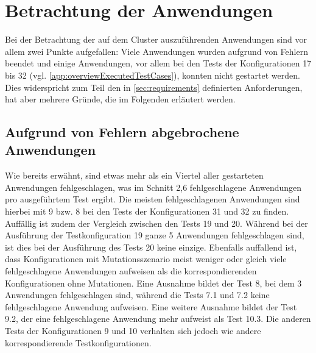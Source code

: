 \section{Betrachtung der Anwendungen}
\label{sec:appEval}

Bei der Betrachtung der auf dem Cluster auszuführenden Anwendungen sind vor allem zwei Punkte aufgefallen:
Viele Anwendungen wurden aufgrund von Fehlern beendet und einige Anwendungen, vor allem bei den Tests der Konfigurationen 17 bis 32 (vgl. \cref{app:overviewExecutedTestCases}), konnten nicht gestartet werden.
Dies widerspricht zum Teil den in \cref{sec:requirements} definierten Anforderungen, hat aber mehrere Gründe, die im Folgenden erläutert werden.

\subsection{Aufgrund von Fehlern abgebrochene Anwendungen}
\label{subsec:failedApps}

Wie bereits erwähnt, sind etwas mehr als ein Viertel aller gestarteten Anwendungen fehlgeschlagen, was im Schnitt 2,6 fehlgeschlagene Anwendungen pro ausgeführtem Test ergibt.
Die meisten fehlgeschlagenen Anwendungen sind hierbei mit 9 bzw. 8 bei den Tests der Konfigurationen 31 und 32 zu finden.
Auffällig ist zudem der Vergleich zwischen den Tests 19 und 20.
Während bei der Ausführung der Testkonfiguration 19 ganze 5 Anwendungen fehlgeschlagen sind, ist dies bei der Ausführung des Tests 20 keine einzige.
Ebenfalls auffallend ist, dass Konfigurationen mit Mutationsszenario meist weniger oder gleich viele fehlgeschlagene Anwendungen aufweisen als die korrespondierenden Konfigurationen ohne Mutationen.
Eine Ausnahme bildet der Test 8, bei dem 3 Anwendungen fehlgeschlagen sind, während die Tests 7.1 und 7.2 keine fehlgeschlagene Anwendung aufweisen.
Eine weitere Ausnahme bildet der Test 9.2, der eine fehlgeschlagene Anwendung mehr aufweist als Test 10.3. Die anderen Tests der Konfigurationen 9 und 10 verhalten sich jedoch wie andere korrespondierende Testkonfigurationen.

